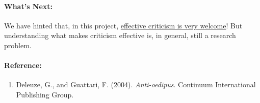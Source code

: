 \paragraph{What's Next:} We have hinted that, in this project,
\href{http://peeragogy.org/how-to-use-this-handbook/}{effective
criticism is very welcome}! But understanding what makes criticism
effective is, in general, still a research problem.

\paragraph{Reference:}

\begin{enumerate}
\itemsep1pt\parskip0pt
\item
  Deleuze, G., and Guattari, F. (2004). \emph{Anti-oedipus}. Continuum
  International Publishing Group.
\end{enumerate}
